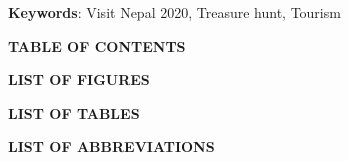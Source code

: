 \documentclass[12pt, a4paper, oneside]{article}
\begin{document}
\textbf{Keywords}: Visit Nepal 2020, Treasure hunt, Tourism\\

\break







\large
{}
\begin{center}
	\textbf{TABLE OF CONTENTS}
\end{center}
\normalsize
\setlength{\cftbeforetoctitleskip}{0pt}
\renewcommand{\contentsname}{}
\tableofcontents

\break










\large
{}
\begin{center}
	\textbf{LIST OF FIGURES}
\end{center}
\renewcommand{\listfigurename}{}
\normalsize
\listoffigures

\break






\large
{}
\begin{center}
	\textbf{LIST OF TABLES}
\end{center}
\renewcommand{\listtablename}{}
\normalsize
\listoftables

\break












\large
{}
\begin{center}
	\textbf{LIST OF ABBREVIATIONS}
\end{center}
\end{document}
